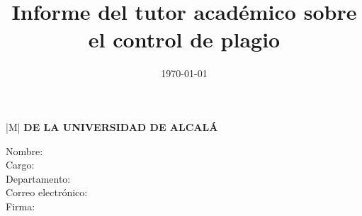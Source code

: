 \documentclass[10pt,a4paper,oneside]{article}
\title{Informe del tutor académico sobre el control de plagio}
\date{\today}                                  %
\author{\myAcademicTutorFullName}              %
\begin{document}
%
%




\newpage

\thispagestyle{plain}


\noindent
\begin{tabular}{|M{\textwidth}|}
\hline
\textbf{\small \MakeUppercase{\wordTutorOrTutora} \MakeUppercase{\wordAcademicoOrAcademica} DE LA UNIVERSIDAD DE ALCALÁ}\vspace*{-5pt}\\
\hline
\end{tabular}



\begin{description}
  \item[Nombre:] \myAcademicTutorFullName
  \item[Cargo:] \myAcademicTutorPosition
  \item[Departamento:] \myAcademicTutorDepartment
  \item[Correo electrónico:] \myAcademicTutorEmail
  \item[Firma:]

\end{description}

\vspace{2.25cm}
\end{document}
